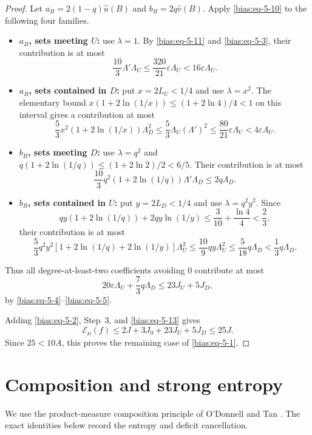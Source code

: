 \documentclass[11pt]{amsart}
\theoremstyle{definition}
\theoremstyle{remark}
\begin{document}
\begin{proof}
Let \(a_B=2(1-q)\widehat u(B)\) and \(b_B=2q\widehat v(B)\). Apply \eqref{bias:eq-5-10} to the following four families.

\begin{itemize}
\item
  \textbf{\(a_B\), sets meeting \(U\):} use \(\lambda=1\). By \eqref{bias:eq-5-11} and \eqref{bias:eq-5-3}, their contribution is at most \[
    \frac{10}{3}\Lambda'\Lambda_U
    \le\frac{320}{21}\varepsilon\Lambda_U
    <16\varepsilon\Lambda_U.
  \]
\item
  \textbf{\(a_B\), sets contained in \(D\):} put \(x=2L_U<1/4\) and use \(\lambda=x^2\). The elementary bound \(x(1+2\ln(1/x))\le(1+2\ln4)/4<1\) on this interval gives a contribution at most \[
   \frac53 x^2(1+2\ln(1/x))\Lambda_D^2
   \le\frac53\Lambda_U(\Lambda')^2
   \le\frac{80}{21}\varepsilon\Lambda_U
   <4\varepsilon\Lambda_U.
  \]
\item
  \textbf{\(b_B\), sets meeting \(D\):} use \(\lambda=q^2\) and \(q(1+2\ln(1/q))\le(1+2\ln2)/2<6/5\). Their contribution is at most \[
   \frac{10}{3}q^2(1+2\ln(1/q))\Lambda'\Lambda_D
   \le2q\Lambda_D.
  \]
\item
  \textbf{\(b_B\), sets contained in \(U\):} put \(y=2L_D<1/4\) and use \(\lambda=q^2y^2\). Since \[
    qy(1+2\ln(1/q))+2qy\ln(1/y)
       \le\frac3{10}+\frac{\ln4}{4}<\frac23,
  \] their contribution is at most \[
   \frac53 q^2y^2[1+2\ln(1/q)+2\ln(1/y)]\Lambda_U^2
   \le\frac{10}{9}qy\Lambda_U^2
   \le\frac5{18}q\Lambda_D
   <\frac13q\Lambda_D.
  \]
\end{itemize}

Thus all degree-at-least-two coefficients avoiding 0 contribute at most \begin{equation}\label{bias:eq-5-13}
20\varepsilon\Lambda_U+\frac73q\Lambda_D
 \le23J_U+5J_D,
\end{equation} by \eqref{bias:eq-5-4}--\eqref{bias:eq-5-5}.

Adding \eqref{bias:eq-5-2}, Step~3, and \eqref{bias:eq-5-13} gives \[
 \mathcal E_\mu(f)\le2J+3J_0+23J_U+5J_D\le25J.
\] Since \(25<10A\), this proves the remaining case of \eqref{bias:eq-5-1}.

\end{proof}

\section{Composition and strong entropy}\label{comp:section}

We use the product-measure composition principle of O'Donnell and Tan \cite{ODT13}. The exact identities below record the entropy and deficit cancellation.
\end{document}
